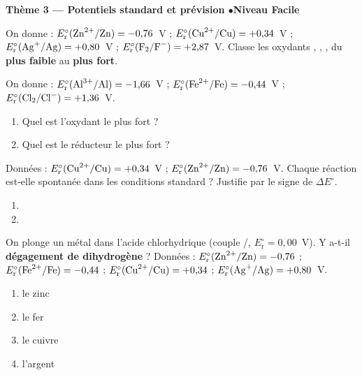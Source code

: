 \documentclass[11pt,a4paper]{article}
\begin{document}
\begin{center}\color{primarydark}\large\bfseries Thème 3 — Potentiels standard et prévision \quad$\bullet$\quad Niveau Facile\end{center}

\begin{exo}
On donne : $E_{\mathrm{r}}^{\circ}(\ce{Zn^{2+}}/\ce{Zn})=-0{,}76$~V ;
$E_{\mathrm{r}}^{\circ}(\ce{Cu^{2+}}/\ce{Cu})=+0{,}34$~V ;
$E_{\mathrm{r}}^{\circ}(\ce{Ag+}/\ce{Ag})=+0{,}80$~V ;
$E_{\mathrm{r}}^{\circ}(\ce{F2}/\ce{F^-})=+2{,}87$~V.
Classe les oxydants , , ,  du \textbf{plus faible} au
\textbf{plus fort}.
\end{exo}

\begin{exo}
On donne : $E_{\mathrm{r}}^{\circ}(\ce{Al^{3+}}/\ce{Al})=-1{,}66$~V ;
$E_{\mathrm{r}}^{\circ}(\ce{Fe^{2+}}/\ce{Fe})=-0{,}44$~V ;
$E_{\mathrm{r}}^{\circ}(\ce{Cl2}/\ce{Cl^-})=+1{,}36$~V.
\begin{enumerate}[label=\alph*)]
  \item Quel est l'oxydant le plus fort ?
  \item Quel est le réducteur le plus fort ?
\end{enumerate}
\end{exo}

\begin{exo}
Données : $E_{\mathrm{r}}^{\circ}(\ce{Cu^{2+}}/\ce{Cu})=+0{,}34$~V ;
$E_{\mathrm{r}}^{\circ}(\ce{Zn^{2+}}/\ce{Zn})=-0{,}76$~V. Chaque réaction est-elle spontanée dans les
conditions standard ? Justifie par le signe de $\Delta E^{\circ}$.
\begin{enumerate}[label=\alph*)]
  \item {}
  \item {}
\end{enumerate}
\end{exo}

\begin{exo}
On plonge un métal dans l'acide chlorhydrique (couple /, $E_{\mathrm{r}}^{\circ}=0{,}00$~V).
Y a-t-il \textbf{dégagement de dihydrogène} ? Données : $E_{\mathrm{r}}^{\circ}(\ce{Zn^{2+}}/\ce{Zn})
=-0{,}76$ ; $E_{\mathrm{r}}^{\circ}(\ce{Fe^{2+}}/\ce{Fe})=-0{,}44$ ;
$E_{\mathrm{r}}^{\circ}(\ce{Cu^{2+}}/\ce{Cu})=+0{,}34$ ;
$E_{\mathrm{r}}^{\circ}(\ce{Ag+}/\ce{Ag})=+0{,}80$~V.
\begin{enumerate}[label=\alph*)]
  \item le zinc 
  \item le fer 
  \item le cuivre 
  \item l'argent 
\end{enumerate}
\end{exo}
\end{document}
